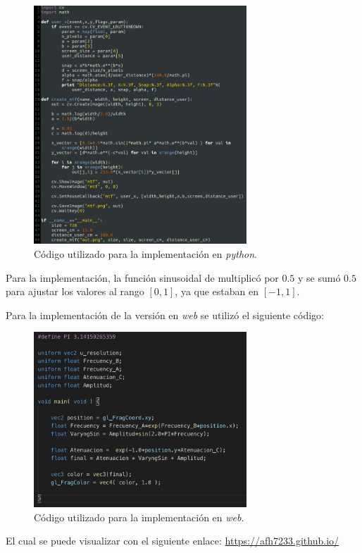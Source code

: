 \documentclass[conference]{IEEEtran}
\begin{document}
\begin{figure}[htbp]
\centerline{\includegraphics[width=80mm]{code/code1}}
\caption{Código utilizado para la implementación en \textit{python}.}
\label{code1}
\end{figure}

Para la implementación, la función sinusoidal de multiplicó por $0.5$ y se sumó $0.5$ para ajustar los valores al rango  $[0,1]$, ya que estaban en $[-1,1]$.


Para la implementación de la versión en \textit{web} se utilizó el siguiente código:

\begin{figure}[htbp]
\centerline{\includegraphics[width=80mm]{code/shaderCode}}
\caption{Código utilizado para la implementación en \textit{web}.}
\label{code2}
\end{figure}

El cual se puede visualizar con el siguiente enlace: \url{https://afh7233.github.io/}
\end{document}
